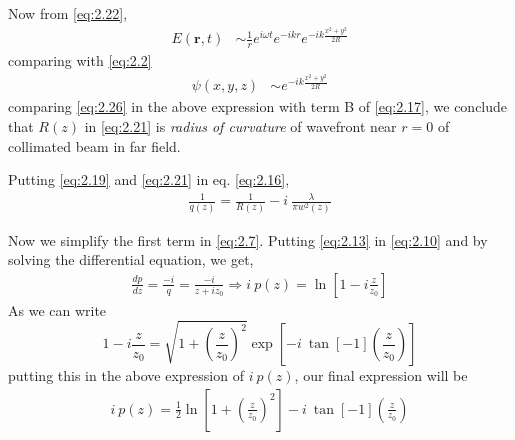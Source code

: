 \documentclass[11pt,a4paper]{article}
\numberwithin{equation}{section}
\begin{document}
Now from \ref{eq:2.22},
\begin{align}
	E(\boldsymbol{r},t) &\sim \frac{1}{r} e^{i\omega t} e^{-ikr} {e^{-ik\frac{x^2+y^2}{2R}}}
\end{align}
comparing with \ref{eq:2.2}
\begin{align}
	\psi({x,y,z}) &\sim e^{-ik\frac{x^2+y^2}{2R}} \label{eq:2.26}
\end{align}
comparing \ref{eq:2.26} in the above expression with term B of \ref{eq:2.17}, we conclude that $R(z)$ in \ref{eq:2.21} is \textit{radius of curvature} of wavefront near $r=0$ of collimated beam in far field.


Putting \ref{eq:2.19} and \ref{eq:2.21} in eq. \ref{eq:2.16},
\begin{align}
	\boxed{\frac{1}{q(z)} = \frac{1}{R(z)} - i\: \frac{\lambda}{\pi w^2(z)}} \label{eq:2.27}
\end{align}


Now we simplify the first term in \ref{eq:2.7}. Putting \ref{eq:2.13} in \ref{eq:2.10} and by solving the differential equation,  we get,
\begin{align}
	\frac{dp}{dz}= \frac{-i}{q} =\frac{-i}{z+iz_0} \Rightarrow i\:p(z) = \ln\left[1- i \frac{z}{z_0}\right]
\end{align}
As we can write
$$
1- i \frac{z}{z_0} = \sqrt{1+ \left(\frac{z}{z_0}\right)^2} \exp\left[{-i\:\tan[-1](\frac{z}{z_0})}\right]
$$
putting this in the above expression of $i\:p(z)$, our final expression will be
\begin{align}
	i\:p(z)=\frac{1}{2}\ln\left[1+ \left(\frac{z}{z_0}\right)^2\right]-i\: \tan[-1](\frac{z}{z_0}) \label{eq:2.29}
\end{align}
\end{document}
